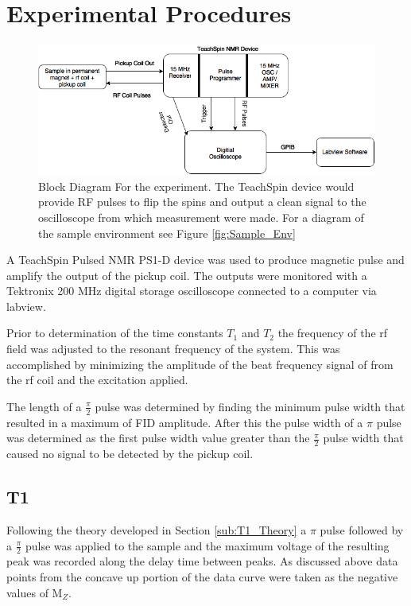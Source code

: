 \documentclass[11pt,letterpaper]{article}
\begin{document}
\section{Experimental Procedures}
\begin{figure}[h!]
  \centering
      \includegraphics[scale=.4]{NMR_Block_Diagram.png}
      \caption{Block Diagram For the experiment. The TeachSpin device would provide RF pulses to flip the spins and output a clean signal to the oscilloscope from which measurement were made. For a diagram of the sample environment see Figure \ref{fig:Sample_Env}}
      \label{fig:Block_Diagram}
\end{figure}	

A TeachSpin Pulsed NMR PS1-D device was used to produce magnetic pulse and amplify the output of the pickup coil. The outputs were monitored with a Tektronix 200 MHz digital storage oscilloscope connected to a computer via labview. 

Prior to determination of the time constants $T_1$ and $T_2$ the frequency of the rf field was adjusted to the resonant frequency of the system. This was accomplished by minimizing the amplitude of the beat frequency signal of from the rf coil and the excitation applied.

The length of a $\frac{\pi}{2}$ pulse was determined by finding the minimum pulse width that resulted in a maximum of FID amplitude. After this the pulse width of a $\pi$ pulse was determined as the first pulse width value greater than the $\frac{\pi}{2}$ pulse width that caused no signal to be detected by the pickup coil.

\subsection{T1}
Following the theory developed in Section \ref{sub:T1_Theory} a $\pi$ pulse followed by a $\frac{\pi}{2}$ pulse was applied to the sample and the maximum voltage of the resulting peak was recorded along the delay time between peaks. As discussed above data points from the concave up portion of the data curve were taken as the negative values of M$_Z$.
\end{document}
